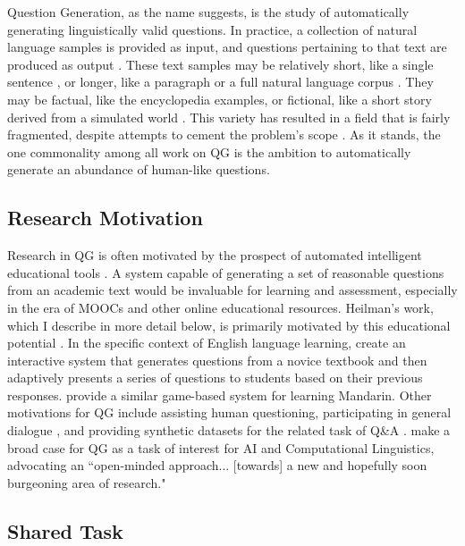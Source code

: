 Question Generation, as the name suggests, is the study of automatically generating linguistically valid questions. In practice, a collection of natural language samples is provided as input, and questions pertaining to that text are produced as output \citep{rus2011question, heilman2011automatic}. These text samples may be relatively short, like a single sentence \citep{ali2010automatic, rus2011question}, or longer, like a paragraph \citep{mannem2010question} or a full natural language corpus \citep{heilman2011automatic}. They may be factual, like the encyclopedia examples, or fictional, like a short story derived from a simulated world \citep{weston2015towards}. This variety has resulted in a field that is fairly fragmented, despite attempts to cement the problem's scope \citep{piwek2008generating}. As it stands, the one commonality among all work on QG is the ambition to automatically generate an abundance of human-like questions. 
 
\subsection{Research Motivation}

Research in QG is often motivated by the prospect of automated intelligent educational tools \citep{graesser2005scaffolding, heilman2011automatic}. A system capable of generating a set of reasonable questions from an academic text would be invaluable for learning and assessment, especially in the era of MOOCs and other online educational resources. Heilman's work, which I describe in more detail below, is primarily motivated by this educational potential \citep{heilman2011automatic}. In the specific context of English language learning, \citet{kunichika2004automated} create an interactive system that generates questions from a novice textbook and then adaptively presents a series of questions to students based on their previous responses. \citet{xu2009automatic} provide a similar game-based system for learning Mandarin. Other motivations for QG include assisting human questioning, participating in general dialogue \citep{walker2001spot}, and providing synthetic datasets for the related task of Q\&A \citep{1603.06807}. \citet{piwek2008generating} make a broad case for QG as a task of interest for AI and Computational Linguistics, advocating an ``open-minded approach... [towards] a new and hopefully soon burgeoning area of research."

\subsection{Shared Task}

